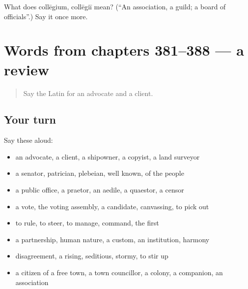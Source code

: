 \begin{tcolorbox}[breakable,colback=teal!4,colframe=teal!35!black,title={Before you move on}]
What does collēgium, collēgiī mean? (\textquotedblleft{}An association, a guild; a board of officials\textquotedblright{}.) Say it once more.
\end{tcolorbox}
\section[(dialogue)]{Words from chapters 381–388 — a review}

\label{lesson:LA-R388-review-381-388}



\begin{quote}
Say the Latin for an advocate and a client.
\end{quote}

\subsection*{Your turn}
Say these aloud:

\begin{itemize}
\raggedright
  \item an advocate, a client, a shipowner, a copyist, a land surveyor
  \item a senator, patrician, plebeian, well known, of the people
  \item a public office, a praetor, an aedile, a quaestor, a censor
  \item a vote, the voting assembly, a candidate, canvassing, to pick out
  \item to rule, to steer, to manage, command, the first
  \item a partnership, human nature, a custom, an institution, harmony
  \item disagreement, a rising, seditious, stormy, to stir up
  \item a citizen of a free town, a town councillor, a colony, a companion, an association
\end{itemize}


